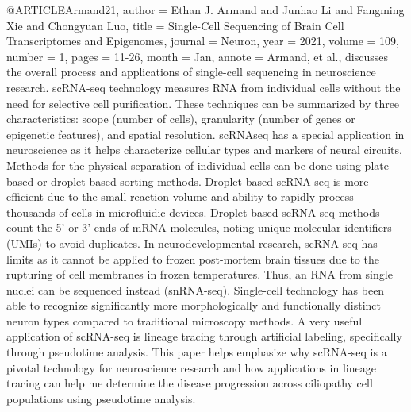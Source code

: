 
@ARTICLE{Armand21,
  author    = {Ethan J. Armand and Junhao Li and Fangming Xie and Chongyuan Luo},
  title     = {Single-Cell Sequencing of Brain Cell Transcriptomes and Epigenomes},
  journal   = {Neuron},
  year      = {2021},
  volume    = {109},
  number    = {1},
  pages     = {11-26},
  month     = {Jan},
  annote    = { Armand, et al.,  discusses the overall process and applications of single-cell sequencing in neuroscience research. scRNA-seq technology measures RNA from individual cells without the need for selective cell purification. These techniques can be summarized by three characteristics: scope (number of cells), granularity (number of genes or epigenetic features), and spatial resolution. scRNAseq has a special application in neuroscience as it helps characterize cellular types and markers of neural circuits. Methods for the physical separation of individual cells can be done using plate-based or droplet-based sorting methods. Droplet-based scRNA-seq is more efficient due to the small reaction volume and ability to rapidly process thousands of cells in microfluidic devices. Droplet-based scRNA-seq methods count the 5’ or 3’ ends of mRNA molecules, noting unique molecular identifiers (UMIs) to avoid duplicates. In neurodevelopmental research, scRNA-seq has limits as it cannot be applied to frozen post-mortem brain tissues due to the rupturing of cell membranes in frozen temperatures. Thus, an RNA from single nuclei can be sequenced instead (snRNA-seq). Single-cell technology has been able to recognize significantly more morphologically and functionally distinct neuron types compared to traditional microscopy methods. A very useful application of scRNA-seq is lineage tracing through artificial labeling, specifically through pseudotime analysis. This paper helps emphasize why scRNA-seq is a pivotal technology for neuroscience research and how applications in lineage tracing can help me determine the disease progression across ciliopathy cell populations using pseudotime analysis.
}
}

